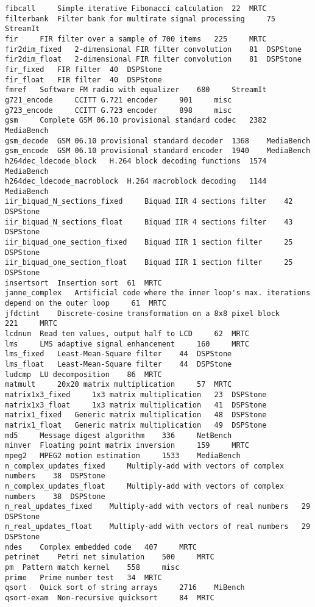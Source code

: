 \documentclass[a4paper,UKenglish]{oasics}
\begin{document}
\begin{verbatim}
fibcall 	Simple iterative Fibonacci calculation 	22 	MRTC
filterbank 	Filter bank for multirate signal processing 	75 	StreamIt
fir 	FIR filter over a sample of 700 items 	225 	MRTC
fir2dim_fixed 	2-dimensional FIR filter convolution 	81 	DSPStone
fir2dim_float 	2-dimensional FIR filter convolution 	81 	DSPStone
fir_fixed 	FIR filter 	40 	DSPStone
fir_float 	FIR filter 	40 	DSPStone
fmref 	Software FM radio with equalizer 	680 	StreamIt
g721_encode 	CCITT G.721 encoder 	901 	misc
g723_encode 	CCITT G.723 encoder 	898 	misc
gsm 	Complete GSM 06.10 provisional standard codec 	2382 	MediaBench
gsm_decode 	GSM 06.10 provisional standard decoder 	1368 	MediaBench
gsm_encode 	GSM 06.10 provisional standard encoder 	1940 	MediaBench
h264dec_ldecode_block 	H.264 block decoding functions 	1574 	MediaBench
h264dec_ldecode_macroblock 	H.264 macroblock decoding 	1144 	MediaBench
iir_biquad_N_sections_fixed 	Biquad IIR 4 sections filter 	42 	DSPStone
iir_biquad_N_sections_float 	Biquad IIR 4 sections filter 	43 	DSPStone
iir_biquad_one_section_fixed 	Biquad IIR 1 section filter 	25 	DSPStone
iir_biquad_one_section_float 	Biquad IIR 1 section filter 	25 	DSPStone
insertsort 	Insertion sort 	61 	MRTC
janne_complex 	Artificial code where the inner loop's max. iterations depend on the outer loop 	61 	MRTC
jfdctint 	Discrete-cosine transformation on a 8x8 pixel block 	221 	MRTC
lcdnum 	Read ten values, output half to LCD 	62 	MRTC
lms 	LMS adaptive signal enhancement 	160 	MRTC
lms_fixed 	Least-Mean-Square filter 	44 	DSPStone
lms_float 	Least-Mean-Square filter 	44 	DSPStone
ludcmp 	LU decomposition 	86 	MRTC
matmult 	20x20 matrix multiplication 	57 	MRTC
matrix1x3_fixed 	1x3 matrix multiplication 	23 	DSPStone
matrix1x3_float 	1x3 matrix multiplication 	41 	DSPStone
matrix1_fixed 	Generic matrix multiplication 	48 	DSPStone
matrix1_float 	Generic matrix multiplication 	49 	DSPStone
md5 	Message digest algorithm 	336 	NetBench
minver 	Floating point matrix inversion 	159 	MRTC
mpeg2 	MPEG2 motion estimation 	1533 	MediaBench
n_complex_updates_fixed 	Multiply-add with vectors of complex numbers 	38 	DSPStone
n_complex_updates_float 	Multiply-add with vectors of complex numbers 	38 	DSPStone
n_real_updates_fixed 	Multiply-add with vectors of real numbers 	29 	DSPStone
n_real_updates_float 	Multiply-add with vectors of real numbers 	29 	DSPStone
ndes 	Complex embedded code 	407 	MRTC
petrinet 	Petri net simulation 	500 	MRTC
pm 	Pattern match kernel 	558 	misc
prime 	Prime number test 	34 	MRTC
qsort 	Quick sort of string arrays 	2716 	MiBench
qsort-exam 	Non-recursive quicksort 	84 	MRTC

\end{verbatim}
\end{document}
